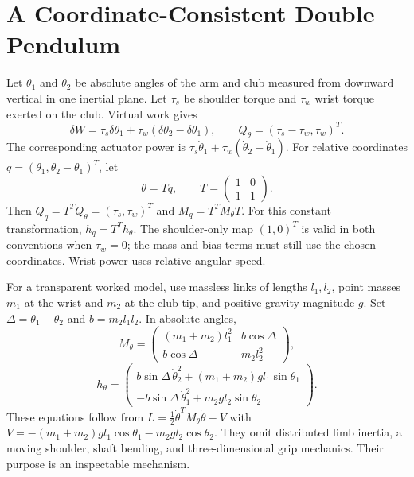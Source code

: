 \section{A Coordinate-Consistent Double Pendulum}

Let $\theta_1$ and $\theta_2$ be absolute angles of the arm and club measured
from downward vertical in one inertial plane. Let $\tau_s$ be shoulder torque
and $\tau_w$ wrist torque exerted on the club. Virtual work gives
\begin{equation}
\delta W=\tau_s\delta\theta_1+\tau_w(\delta\theta_2-\delta\theta_1),
\qquad Q_\theta=(\tau_s-\tau_w,\tau_w)^T.
\end{equation}
The corresponding actuator power is
$\tau_s\dot\theta_1+\tau_w(\dot\theta_2-\dot\theta_1)$.
For relative coordinates $q=(\theta_1,\theta_2-\theta_1)^T$, let
\begin{equation}
\theta=Tq,\qquad T=\begin{pmatrix}1&0\\1&1\end{pmatrix}.
\end{equation}
Then $Q_q=T^TQ_\theta=(\tau_s,\tau_w)^T$ and $M_q=T^TM_\theta T$.
For this constant transformation, $h_q=T^Th_\theta$. The shoulder-only map
$(1,0)^T$ is valid in both conventions when $\tau_w=0$; the mass and bias terms
must still use the chosen coordinates. Wrist power uses relative angular speed.

For a transparent worked model, use massless links of lengths $l_1,l_2$,
point masses $m_1$ at the wrist and $m_2$ at the club tip, and positive gravity
magnitude $g$. Set $\Delta=\theta_1-\theta_2$ and $b=m_2l_1l_2$. In absolute angles,
\begin{equation}
M_\theta=\begin{pmatrix}
(m_1+m_2)l_1^2&b\cos\Delta\\
b\cos\Delta&m_2l_2^2
\end{pmatrix},
\end{equation}
\begin{equation}
h_\theta=\begin{pmatrix}
b\sin\Delta\,\dot\theta_2^2+(m_1+m_2)gl_1\sin\theta_1\\
-b\sin\Delta\,\dot\theta_1^2+m_2gl_2\sin\theta_2
\end{pmatrix}.
\end{equation}
These equations follow from $L=\tfrac12\dot\theta^TM_\theta\dot\theta-V$ with
$V=-(m_1+m_2)gl_1\cos\theta_1-m_2gl_2\cos\theta_2$.
They omit distributed limb inertia, a moving shoulder, shaft bending, and
three-dimensional grip mechanics. Their purpose is an inspectable mechanism.

